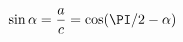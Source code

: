 \documentclass[preview]{standalone}
\begin{document}
\begin{align*}
\sin\alpha = \frac{a}{c} = \cos(\PI/2 - \alpha)
\end{align*}
\end{document}
